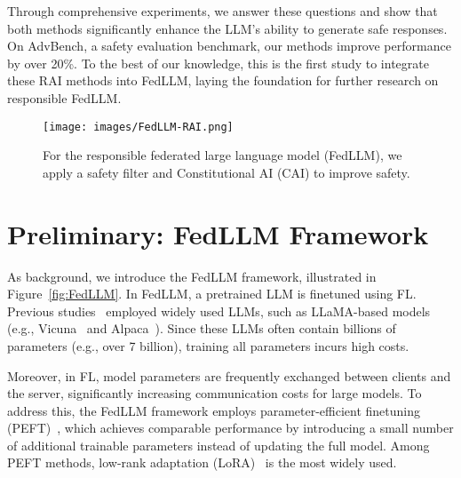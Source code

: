 Through comprehensive experiments, we answer these questions and show that both methods significantly enhance the LLM's ability to generate safe responses. 
On AdvBench, a safety evaluation benchmark, our methods improve performance by over 20\%.
To the best of our knowledge, this is the first study to integrate these RAI methods into FedLLM, laying the foundation for further research on responsible FedLLM.


\begin{figure}[t]
\centering
    \texttt{[image: images/FedLLM-RAI.png]} 
    \vspace{-6mm}
    \caption{For the responsible federated large language model (FedLLM), we apply a safety filter and Constitutional AI (CAI) to improve safety.
}
    \label{fig:safetyfilter_CAI}
\end{figure}




\section{Preliminary: FedLLM Framework}\label{subsec:pre-fedllm}
As background, we introduce the FedLLM framework, illustrated in Figure~\ref{fig:FedLLM}.
In FedLLM, a pretrained LLM is finetuned using FL.
Previous studies~\cite{FedPETuning,FedIT,sun2024improving,kuang2024federatedscope,OpenFedLLM} employed widely used LLMs, such as LLaMA\cite{touvron2023llama2}-based models (e.g., Vicuna~\cite{vicuna2023} and Alpaca~\cite{alpaca}).
Since these LLMs often contain billions of parameters (e.g., over 7 billion), training all parameters incurs high costs.

Moreover, in FL, model parameters are frequently exchanged between clients and the server, significantly increasing communication costs for large models. 
To address this, the FedLLM framework employs parameter-efficient finetuning (PEFT)~\cite{adapter,lora}, which achieves comparable performance by introducing a small number of additional trainable parameters instead of updating the full model. 
Among PEFT methods, low-rank adaptation (LoRA)~\cite{lora} is the most widely used.


